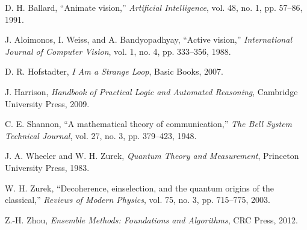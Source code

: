 \begin{thebibliography}{99}
D. H. Ballard, ``Animate vision,'' \textit{Artificial Intelligence}, vol. 48, no. 1, pp. 57--86, 1991.

J. Aloimonos, I. Weiss, and A. Bandyopadhyay, ``Active vision,'' \textit{International Journal of Computer Vision}, vol. 1, no. 4, pp. 333--356, 1988.

D. R. Hofstadter, \textit{I Am a Strange Loop}, Basic Books, 2007.

J. Harrison, \textit{Handbook of Practical Logic and Automated Reasoning}, Cambridge University Press, 2009.

C. E. Shannon, ``A mathematical theory of communication,'' \textit{The Bell System Technical Journal}, vol. 27, no. 3, pp. 379--423, 1948.

J. A. Wheeler and W. H. Zurek, \textit{Quantum Theory and Measurement}, Princeton University Press, 1983.

W. H. Zurek, ``Decoherence, einselection, and the quantum origins of the classical,'' \textit{Reviews of Modern Physics}, vol. 75, no. 3, pp. 715--775, 2003.

Z.-H. Zhou, \textit{Ensemble Methods: Foundations and Algorithms}, CRC Press, 2012.

\end{thebibliography}
